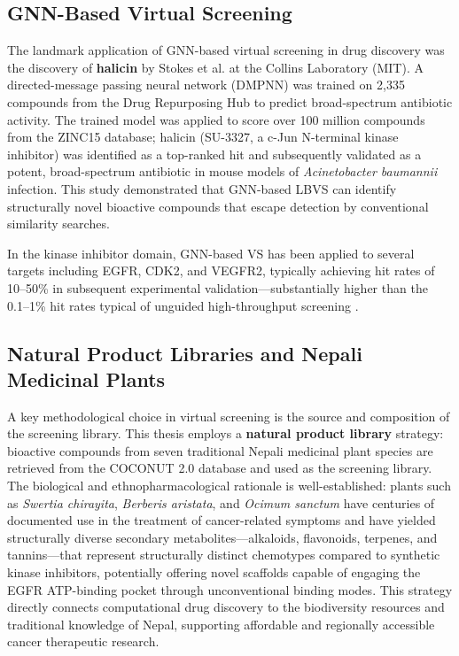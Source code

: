 \subsection{GNN-Based Virtual Screening}

The landmark application of GNN-based virtual screening in drug discovery was
the discovery of \textbf{halicin} by Stokes et al. \parencite{stokes2020deep}
at the Collins Laboratory (MIT). A directed-message passing neural network (DMPNN)
was trained on 2,335 compounds from the Drug Repurposing Hub to predict broad-spectrum
antibiotic activity. The trained model was applied to score over 100 million compounds
from the ZINC15 database; halicin (SU-3327, a c-Jun N-terminal kinase inhibitor)
was identified as a top-ranked hit and subsequently validated as a potent,
broad-spectrum antibiotic in mouse models of \textit{Acinetobacter baumannii}
infection. This study demonstrated that GNN-based LBVS can identify structurally
novel bioactive compounds that escape detection by conventional similarity searches.

In the kinase inhibitor domain, GNN-based VS has been applied to several targets
including EGFR, CDK2, and VEGFR2, typically achieving hit rates of 10--50\% in
subsequent experimental validation---substantially higher than the 0.1--1\% hit
rates typical of unguided high-throughput screening \parencite{sun2021gcn}.

\subsection{Natural Product Libraries and Nepali Medicinal Plants}

A key methodological choice in virtual screening is the source and composition of
the screening library. This thesis employs a \textbf{natural product library} strategy:
bioactive compounds from seven traditional Nepali medicinal plant species are retrieved
from the COCONUT 2.0 database and used as the screening library. The biological and
ethnopharmacological rationale is well-established: plants such as
\textit{Swertia chirayita}, \textit{Berberis aristata}, and \textit{Ocimum sanctum}
have centuries of documented use in the treatment of cancer-related symptoms and have
yielded structurally diverse secondary metabolites---alkaloids, flavonoids, terpenes,
and tannins---that represent structurally distinct chemotypes compared to synthetic
kinase inhibitors, potentially offering novel scaffolds capable of engaging the EGFR
ATP-binding pocket through unconventional binding modes. This strategy directly
connects computational drug discovery to the biodiversity resources and traditional
knowledge of Nepal, supporting affordable and regionally accessible cancer therapeutic
research.

